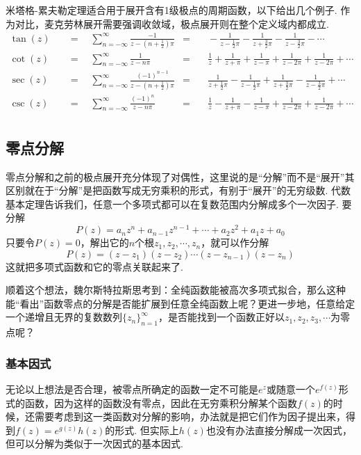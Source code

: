 米塔格-累夫勒定理适合用于展开含有1级极点的周期函数，以下给出几个例子. 作为对比，麦克劳林展开需要强调收敛域，极点展开则在整个定义域内都成立.
\begin{align*}
    \tan(z) \quad&=\quad \sum_{n=-\infty}^{\infty}\frac{-1}{z-\left(n+\frac{1}{2}\right)\pi} &=&\quad -\frac{1}{z-\frac{1}{2}\pi}-\frac{1}{z+\frac{3}{2}\pi}-\frac{1}{z-\frac{3}{2}\pi}-\cdots & \\
    \cot(z) \quad&=\quad \sum_{n=-\infty}^{\infty}\frac{1}{z-n\pi} &=&\quad \frac{1}{z}+\frac{1}{z+\pi}+\frac{1}{z-\pi}+\frac{1}{z-2\pi}+\frac{1}{z-2\pi}+\cdots & \\
    \sec(z) \quad&=\quad \sum_{n=-\infty}^{\infty}\frac{(-1)^{n-1}}{z-\left(n+\frac{1}{2}\right)\pi} &=&\quad \frac{1}{z+\frac{1}{2}\pi}-\frac{1}{z-\frac{1}{2}\pi}+\frac{1}{z+\frac{3}{2}\pi}-\frac{1}{z-\frac{3}{2}\pi}+\cdots & \\
    \csc(z) \quad&=\quad \sum_{n=-\infty}^{\infty}\frac{(-1)^{n}}{z-n\pi} &=&\quad \frac{1}{z}-\frac{1}{z+\pi}-\frac{1}{z-\pi}+\frac{1}{z-2\pi}+\frac{1}{z-2\pi}+\cdots & \\
\end{align*}

\subsection{零点分解}

零点分解和之前的极点展开充分体现了对偶性，这里说的是“分解”而不是“展开”其区别就在于“分解”是把函数写成无穷乘积的形式，有别于“展开”的无穷级数. 代数基本定理告诉我们，任意一个多项式都可以在复数范围内分解成多个一次因子. 要分解
\[P(z)=a_nz^n+a_{n-1}z^{n-1}+\cdots+a_2z^2+a_1z+a_0\]
只要令\(P(z)=0\)，解出它的\(n\)个根\(z_1,z_2,\cdots,z_n\)，就可以作分解
\[P(z) = (z-z_1)(z-z_2)\cdots(z-z_{n-1})(z-z_n)\]
这就把多项式函数和它的零点关联起来了.

顺着这个想法，魏尔斯特拉斯思考到：全纯函数能被高次多项式拟合，那么这种能“看出”函数零点的分解是否能扩展到任意全纯函数上呢？更进一步地，任意给定一个递增且无界的复数数列\(\{z_n\}_{n=1}^{\infty}\)，是否能找到一个函数正好以\(z_1,z_2,z_3,\cdots\)为零点呢？

\subsubsection{基本因式}

无论以上想法是否合理，被零点所确定的函数一定不可能是\(e^{z}\)或随意一个\(e^{f(z)}\)形式的函数，因为这样的函数没有零点，因此在无穷乘积分解某个函数\(f(z)\)的时候，还需要考虑到这一类函数对分解的影响，办法就是把它们作为因子提出来，得到\(f(z)=e^{g(z)}h(z)\)的形式. 但实际上\(h(z)\)也没有办法直接分解成一次因式，但可以分解为类似于一次因式的基本因式.

